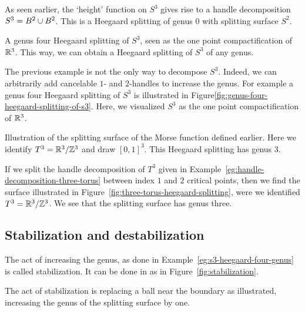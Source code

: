 \begin{eg}
    As seen earlier, the `height' function on $S^{3}$ gives rise to a handle decomposition $S^{3} = B^{2} \cup B^{2}$. This is a Heegaard splitting of genus $0$ with splitting surface $S^{2}$.
\end{eg}
\begin{eg}
    \begin{marginfigure}
        \centering
        \caption{A genus four Heegaard splitting of $S^{3}$, seen as the one point compactification of $\mathbb{R}^3$.
            This way, we can obtain a Heegaard splitting of $S^{3}$ of any genus.
        }
        \label{fig:genus-four-heegaard-splitting-of-s3}
    \end{marginfigure}
    The previous example is not the only way to decompose $S^{3}$.
    Indeed, we can arbitrarily add cancelable $1$- and $2$-handles to increase the genus. 
    For example a genus four Heegaard splitting of $S^{3}$ is illustrated in Figure\ref{fig:genus-four-heegaard-splitting-of-s3}.
    Here, we visualized $S^{3}$ as the one point compactification of $\mathbb{R}^3$.
    \label{eg:s3-heegaard-four-genus}
\end{eg}
\begin{marginfigure}
    \centering
    \caption{
        Illustration of the splitting surface of the Morse function defined earlier.
        Here we identify $T^{3} = \mathbb{R}^3 / \mathbb{Z}^3$ and draw $[0,1]^3$.
        This Heegaard splitting has genus $3$.
    }
    \label{fig:three-torus-heegaard-splitting}
\end{marginfigure}
\begin{eg}
    If we split the handle decomposition of $T^{3}$ given in Example~\ref{eg:handle-decomposition-three-torus} between index $1$ and $2$ critical points, then we find the surface illustrated in Figure~\ref{fig:three-torus-heegaard-splitting}, were we identified $T^{3} = \mathbb{R}^3 / \mathbb{Z}^{3}$.
    We see that the splitting surface has genus three.
\end{eg}

\subsection{Stabilization and destabilization}

The act of increasing the genus, as done in Example~\ref{eg:s3-heegaard-four-genus} is called stabilization.
It can be done in as in Figure~\ref{fig:stabilization}.

\begin{marginfigure}
    \centering
    \caption{
        The act of stabilization is replacing a ball near the boundary as illustrated, increasing the genus of the splitting surface by one.}
    \label{fig:stabilization}
\end{marginfigure}
